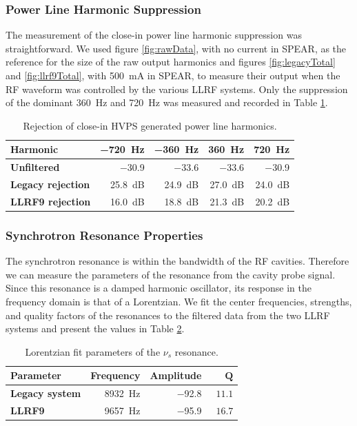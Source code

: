 \documentclass[letterpaper,11pt]{article}
\begin{document}
\subsubsection{Power Line Harmonic Suppression}
The measurement of the close-in power line harmonic suppression was straightforward.  We used figure \ref{fig:rawData}, with no current in SPEAR, as the reference for the size of the raw output harmonics and figures \ref{fig:legacyTotal} and \ref{fig:llrf9Total}, with \SI{500}{\mA} in SPEAR, to measure their output when the RF waveform was controlled by the various LLRF systems.  Only the suppression of the dominant \SI{360}{\Hz} and \SI{720}{\Hz} was measured and recorded in Table \ref{tbl:harmonics}.
\begin{table}[hbtp]
	\begin{center}
		\begin{tabular}{|l|r|r|r|r|}
			\hline
			\textbf{Harmonic} & \SI{-720}{\Hz} & \SI{-360}{\Hz} & \SI{360}{\Hz} & \SI{720}{\Hz} \\ \hline
			\textbf{Unfiltered} & \SI{-30.9}{\dBc} & \SI{-33.6}{\dBc} & \SI{-33.6}{\dBc} & \SI{-30.9}{\dBc} \\ \hline
			\textbf{Legacy rejection} & \SI{25.8}{\dB} & \SI{24.9}{\dB} & \SI{27.0}{\dB} & \SI{24.0}{\dB} \\ \hline
			\textbf{LLRF9 rejection} & \SI{16.0}{\dB} & \SI{18.8}{\dB} & \SI{21.3}{\dB} & \SI{20.2}{\dB} \\ \hline
		\end{tabular}
		\caption{Rejection of close-in HVPS generated power line harmonics.}\label{tbl:harmonics}
	\end{center}
\end{table}
\subsubsection{Synchrotron Resonance Properties}
The synchrotron resonance is within the bandwidth of the RF cavities.  Therefore we can measure the parameters of the resonance from the cavity probe signal.  Since this resonance is a damped harmonic oscillator, its response in the frequency domain is that of a Lorentzian.  We fit the center frequencies, strengths, and quality factors of the resonances to the filtered data from the two LLRF systems and present the values in Table \ref{tbl:nus}.
\begin{table}[hbtp]
	\begin{center}
		\begin{tabular}{|l|r|r|r|}
			\hline
			\textbf{Parameter} & \textbf{Frequency} & \textbf{Amplitude} & $ \mathbf{Q} $ \\ \hline
			\textbf{Legacy system} & \SI{8932}{\Hz} & \SI{-92.8}{\dBc} & \ $ 11.1 $ \\ \hline
			\textbf{LLRF9} & \SI{9657}{\Hz} & \SI{-95.9}{\dBc} & \ $ 16.7 $ \\ \hline
		\end{tabular}
		\caption{Lorentzian fit parameters of the $ \nu_{s} $ resonance.}\label{tbl:nus}
	\end{center}
\end{table}
\end{document}

